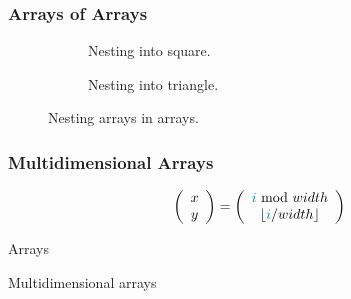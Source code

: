 \subsubsection{Arrays of Arrays}


\begin{figure}[tbp]
  \begin{subfigure}[b]{0.45\textwidth}
    
    \caption{Nesting into square.}
    \label{fig:data:array:nest:square}
  \end{subfigure}
  \hfill
  \begin{subfigure}[b]{0.45\textwidth}
    
    \caption{Nesting into triangle.}
    \label{fig:data:array:nest:triangle}
  \end{subfigure}
  \caption{Nesting arrays in arrays.}
  \label{fig:data:array:nest}
\end{figure}

\subsubsection{Multidimensional Arrays}

\begin{equation}
  \left(
    \begin{array}{c}
      x \\
      y
    \end{array}
  \right)
  = 
  \left(
    \begin{array}{c}
      \textcolor{teal}{i} ~\mathrm{mod}~ width \\
      \lfloor \textcolor{teal}{i} / width \rfloor
    \end{array}
  \right)
\end{equation}

\csharpsubsubsection{\csharp}

\begin{syntaxfloat}
  
  \caption{Arrays}
  \label{syntax:data:array}
\end{syntaxfloat}




\begin{syntaxfloat}
  
  \caption{Multidimensional arrays}
  \label{syntax:data:marray}
\end{syntaxfloat}

